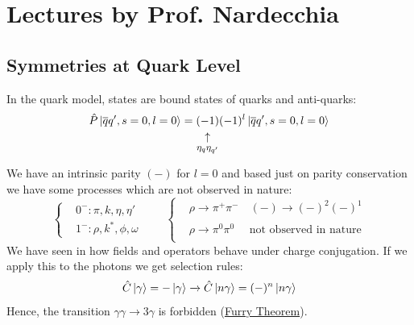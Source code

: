 \documentclass[../main.tex]{subfiles}
\begin{document}
\setchapterpreamble[u]{\margintoc}
\chapter[Lectures by Prof. Nardecchia]{Lectures by Prof. Nardecchia\footnotemark[0]}
\section{Symmetries at Quark Level}
In the quark model, states are bound states of quarks and anti-quarks:
\[
\hat{P}\ket{\overline{q}q',s=0,l=0}=\underset{\mathclap{\tikz \node {$\uparrow$} node [below=1ex] {\footnotesize  $\eta_q\eta_{q'}$};}}{(-1)}(-1)^l\ket{\overline{q}q',s=0,l=0}
\]
We have an intrinsic parity $(-)$ for $l=0$ and based just on parity conservation we have some processes which are not observed in nature:
\[
\left\{
\begin{aligned}
&0^-: \pi,k,\eta,\eta'\\
&1^-: \rho,k^*,\phi,\omega
\end{aligned}
\right.
\qquad
\left\{
\begin{aligned}
&\rho\xrightarrow[]{}\pi^+\pi^- \quad (-)\xrightarrow[]{}(-)^2(-)^1\\
&\rho\xrightarrow[]{}\pi^0\pi^0 \quad \text{ not observed in nature}
\end{aligned}
\right.
\]
We have seen in  how fields and operators behave under charge conjugation. If we apply this to the photons we get selection rules:
\[
\hat{C}\ket{\gamma}=-\ket{\gamma}\xrightarrow[]{}\hat{C}\ket{n\gamma}=(-)^n\ket{n\gamma}
\]
Hence, the transition $\gamma\gamma\xrightarrow[]{}3\gamma$ is forbidden (\href{https://en.wikipedia.org/wiki/Furry's_theorem}{Furry Theorem}).
\end{document}
